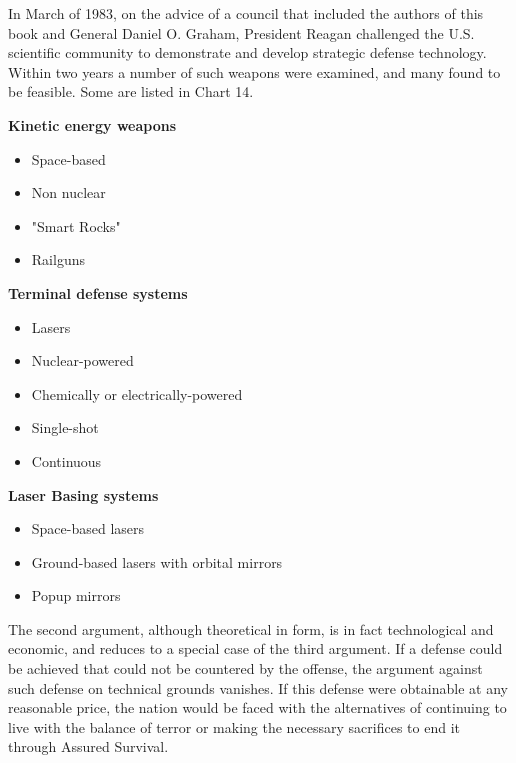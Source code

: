\begin{mdframed}[backgroundcolor=black!10]
In March of 1983, on the advice of a council that included the authors of this book and General Daniel O. Graham, President Reagan challenged the U.S. scientific community to demonstrate and develop strategic defense technology. Within two years a number of such weapons were examined, and many found to be feasible. Some are listed in Chart 14.
\end{mdframed}

\begin{mdframed}[backgroundcolor=ApricotWhite, frametitle={CHART 14: Potential Strategic Defense Systems}]
\textbf{Kinetic energy weapons}
    \begin{itemize}
        \item Space-based
        \item Non nuclear
        \item "Smart Rocks"
        \item Railguns
    \end{itemize}
\textbf{Terminal defense systems}
    \begin{itemize}
        \item Lasers
        \item Nuclear-powered
        \item Chemically or electrically-powered
        \item Single-shot 
        \item Continuous
    \end{itemize}
\textbf{Laser Basing systems}
    \begin{itemize}
        \item Space-based lasers
        \item Ground-based lasers with orbital mirrors
        \item Popup mirrors
    \end{itemize}
\end{mdframed}

The second argument, although theoretical in form, is in fact technological and economic, and reduces to a special case of the third argument. If a defense could be achieved that could not be countered by the offense, the argument against such defense on technical grounds vanishes. If this defense were obtainable at any reasonable price, the nation would be faced with the alternatives of continuing to live with the balance of terror or making the necessary sacrifices to end it through Assured Survival.

